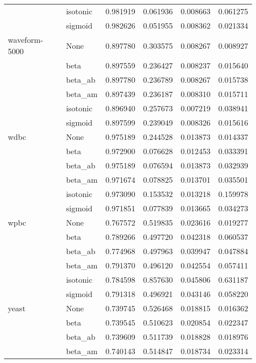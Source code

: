 \begin{tabular}{llrrrr}
        & isotonic &  0.981919 &  0.061936 &  0.008663 &  0.061275 \\
        & sigmoid &  0.982626 &  0.051955 &  0.008362 &  0.021334 \\
waveform-5000 & None &  0.897780 &  0.303575 &  0.008267 &  0.008927 \\
        & beta &  0.897559 &  0.236427 &  0.008237 &  0.015640 \\
        & beta\_ab &  0.897780 &  0.236789 &  0.008267 &  0.015738 \\
        & beta\_am &  0.897439 &  0.236187 &  0.008310 &  0.015711 \\
        & isotonic &  0.896940 &  0.257673 &  0.007219 &  0.038941 \\
        & sigmoid &  0.897599 &  0.239049 &  0.008326 &  0.015616 \\
wdbc & None &  0.975189 &  0.244528 &  0.013873 &  0.014337 \\
        & beta &  0.972900 &  0.076628 &  0.012453 &  0.033391 \\
        & beta\_ab &  0.975189 &  0.076594 &  0.013873 &  0.032939 \\
        & beta\_am &  0.971674 &  0.078825 &  0.013701 &  0.035501 \\
        & isotonic &  0.973090 &  0.153532 &  0.013218 &  0.159978 \\
        & sigmoid &  0.971851 &  0.077839 &  0.013665 &  0.034273 \\
wpbc & None &  0.767572 &  0.519835 &  0.023616 &  0.019277 \\
        & beta &  0.789266 &  0.497720 &  0.042318 &  0.060537 \\
        & beta\_ab &  0.774968 &  0.497963 &  0.039947 &  0.047884 \\
        & beta\_am &  0.791370 &  0.496120 &  0.042554 &  0.057411 \\
        & isotonic &  0.784598 &  0.857630 &  0.045806 &  0.631187 \\
        & sigmoid &  0.791318 &  0.496921 &  0.043146 &  0.058220 \\
yeast & None &  0.739745 &  0.526468 &  0.018815 &  0.016362 \\
        & beta &  0.739545 &  0.510623 &  0.020854 &  0.022347 \\
        & beta\_ab &  0.739609 &  0.511739 &  0.018828 &  0.018976 \\
        & beta\_am &  0.740143 &  0.514847 &  0.018734 &  0.023314 \\

\end{tabular}

